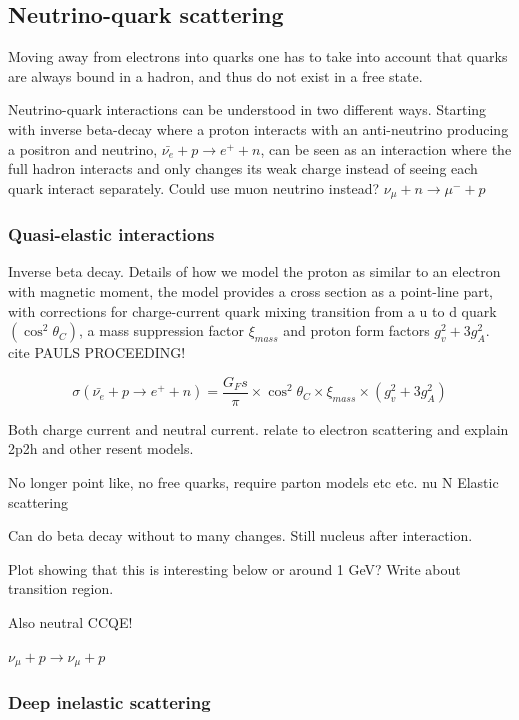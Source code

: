 \subsection{Neutrino-quark scattering}
Moving away from electrons into quarks one has to take into account that quarks are always bound in a hadron, and thus do not exist in a free state. 

Neutrino-quark interactions can be understood in two different ways. Starting with inverse beta-decay where a proton interacts with an anti-neutrino producing a positron and neutrino, $\bar{\nu_e}+p \rightarrow e^+ + n$, can be seen as an interaction where the full hadron interacts and only changes its weak charge instead of seeing each quark interact separately.  Could use muon neutrino instead? $\nu_\mu + n \rightarrow \mu^- + p$

\subsubsection{Quasi-elastic interactions}
Inverse beta decay. Details of how we model the proton as similar to an electron with magnetic moment, the model provides a cross section as a point-line part, with corrections for charge-current quark mixing transition from a u to d quark $( \cos^2 \theta_C)$, a mass suppression factor $\xi_{mass}$ and proton form factors $g^2_v + 3 g^2_A$. cite PAULS PROCEEDING!

\begin{equation}
\sigma(\bar{\nu_e} + p \rightarrow e^+ + n) = \frac{G_Fs}{\pi} \times \cos^2 \theta_C \times \xi_{mass} \times (g^2_v + 3 g^2_A)
\end{equation}

Both charge current and neutral current. relate to electron scattering and explain 2p2h and other resent models.

No longer point like, no free quarks, require parton models etc etc. nu N Elastic scattering

Can do beta decay without to many changes. Still nucleus after interaction.

Plot showing that this is interesting below or around 1 GeV? Write about transition region.


Also neutral CCQE!

$\nu_\mu + p \rightarrow \nu_\mu + p$

\subsubsection{Deep inelastic scattering}

